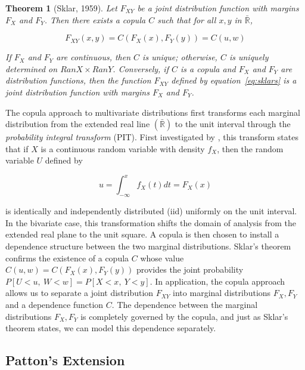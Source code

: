 \documentclass[12pt]{article}
\newtheorem{thm}{Theorem}
\begin{document}
\begin{thm} [Sklar, 1959] \label{thm:skl}
	Let $F_{XY}$ be a joint distribution function with margins $F_{X}$ and $F_{Y}$. Then there exists a copula $C$ such that for all $x,y$ in $\bar{\mathbb{R}}$,

	\begin{equation} \label{eq:sklars}
		F_{XY}\left( x,y\right) =C\left(F_{X}\left(x\right), F_{Y}\left(y\right)\right) = C\left(u,w\right)
	\end{equation}

	If $F_{X}$ and $F_{Y}$ are continuous, then $C$ is unique; otherwise, $C$ is uniquely determined on $RanX\times RanY$. Conversely, if $C$ is a copula and $F_{X}$ and $F_{Y}$ are distribution functions, then the function $F_{XY}$ defined by equation~\ref{eq:sklars} is a joint distribution function with margins $F_{X}$ and $F_{Y}$.
\end{thm}

The copula approach to multivariate distributions first transforms each marginal distribution from the extended real line $\left(\bar{\mathbb{R}}\right)$ to the unit interval through the \textit{probability integral transform} (PIT). First investigated by \cite{Rosenblatt_1952}, this transform states that if $X$ is a continuous random variable with density $f_{X}$, then the random variable $U$ defined by

\begin{equation} \label{eqn:PIT}
	u=\int_{-\infty}^{x}f_{X}\left(t\right) dt=F_{X}\left(x\right)
\end{equation}

is identically and independently distributed (iid) uniformly on the unit interval. In the bivariate case, this transformation shifts the domain of analysis from the extended real plane to the unit square. A copula is then chosen to install a dependence structure between the two marginal distributions. Sklar's theorem confirms the existence of a copula $C$ whose value $C\left(u,w\right) = C\left(F_{X}\left(x\right), F_{Y}\left(y\right)\right)$ provides the joint probability $P\left[U < u,~W < w\right] = P\left[X < x,~Y < y\right]$. In application, the copula approach allows us to separate a joint distribution $F_{XY}$ into marginal distributions $F_{X},F_{Y}$ and a dependence function $C$. The dependence between the marginal distributions $F_{X},F_{Y}$ is completely governed by the copula, and just as Sklar's theorem states, we can model this dependence separately.

\subsection{Patton's Extension}
\end{document}
